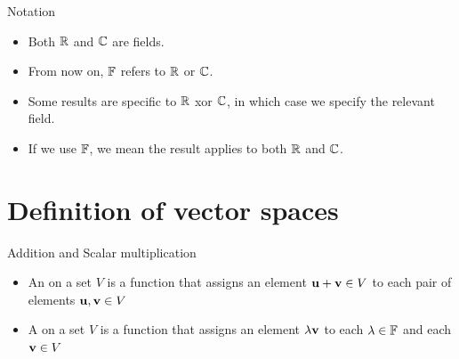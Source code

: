 \documentclass[aspectratio=169]{beamer}
\begin{document}
\begin{frame}{Notation}
\begin{itemize}
    \item Both $\mathbb{R}$ and $\mathbb{C}$ are fields.
    \item From now on, $\mathbb{F}$ refers to $\mathbb{R}$ or $\mathbb{C}$.
    \item Some results are specific to $\mathbb{R}$ xor $\mathbb{C}$, in which case we specify the relevant field.
    \item If we use $\mathbb{F}$, we mean the result applies to both $\mathbb{R}$ and $\mathbb{C}$.
\end{itemize}
\end{frame}




\section{Definition of vector spaces}

\begin{frame}{Addition and Scalar multiplication}
\begin{definition}
\begin{itemize}
\item An  on a set $V$ is a function that assigns an element $\mathbf{u}+\mathbf{v}\in V$ to each pair of elements $\mathbf{u},\mathbf{v}\in V$
\item  A  on a set $V$ is a function that assigns an element $\lambda \mathbf{v}$ to each $\lambda\in\mathbb{F}$ and each $\mathbf{v}\in V$
\end{itemize}
\end{definition}
\end{frame}
\end{document}
